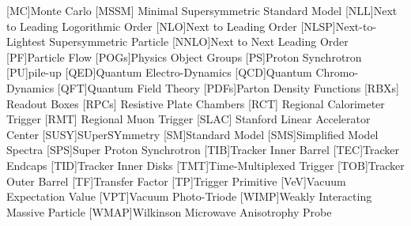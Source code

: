 \begin{acronym}[AAAAAAA]
[MC]{Monte Carlo}
 [MSSM] {Minimal Supersymmetric Standard Model}
[NLL]{Next to Leading Logorithmic Order}
[NLO]{Next to Leading Order}
[NLSP]{Next-to-Lightest Supersymmetric Particle}
[NNLO]{Next to Next Leading Order}
[PF]{Particle Flow}
[POGs]{Physics Object Groups}
[PS]{Proton Synchrotron}
[PU]{pile-up}
[QED]{Quantum Electro-Dynamics}
[QCD]{Quantum Chromo-Dynamics}
[QFT]{Quantum Field Theory}
[PDFs]{Parton Density Functions}
 [RBXs] {Readout Boxes}
 [RPCs] {Resistive Plate Chambers}
 [RCT] {Regional Calorimeter Trigger}
 [RMT] {Regional Muon Trigger}
 [SLAC] {Stanford Linear Accelerator Center}
[SUSY]{SUperSYmmetry}
[SM]{Standard Model}
[SMS]{Simplified Model Spectra}
[SPS]{Super Proton Synchrotron}
[TIB]{Tracker Inner Barrel} 
[TEC]{Tracker Endcaps} 
[TID]{Tracker Inner Disks}
[TMT]{Time-Multiplexed Trigger}
[TOB]{Tracker Outer Barrel} 
[TF]{Transfer Factor}
[TP]{Trigger Primitive}
[VeV]{Vacuum Expectation Value}
[VPT]{Vacuum Photo-Triode}
[WIMP]{Weakly Interacting Massive Particle}
[WMAP]{Wilkinson Microwave Anisotrophy Probe}

\end{acronym}

